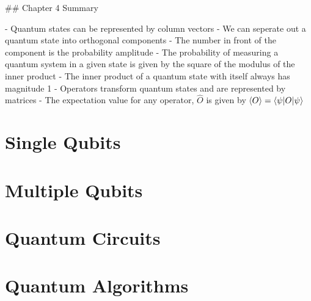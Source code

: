 \documentclass{book}
\begin{document}
## Chapter 4 Summary 

- Quantum states can be represented by column vectors 
- We can seperate out a quantum state into orthogonal components 
- The number in front of the component is the probability amplitude
- The probability of measuring a quantum system in a given state is given by the square of the modulus of the inner product
- The inner product of a quantum state with itself always has magnitude 1
- Operators transform quantum states and are represented by matrices
- The expectation value for any operator, $\hat{O}$  is given by $\braket{O} = \braket{\psi|O|\psi}$
\section{Single Qubits}
\section{Multiple Qubits}
\section{Quantum Circuits}
\section{Quantum Algorithms}
\end{document}
